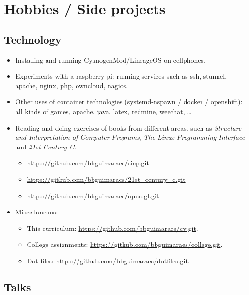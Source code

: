 \section*{Hobbies / Side projects}

\subsection*{Technology}

\begin{itemize}
    \item Installing and running CyanogenMod/LineageOS on cellphones.
    \item
        Experiments with a raspberry pi: running services such as ssh, stunnel,
        apache, nginx, php, owncloud, nagios.
    \item
        Other uses of container technologies (systemd-nspawn / docker /
        openshift): all kinds of games, apache, java, latex, redmine, weechat,
        …
    \item
        Reading and doing exercises of books from different areas, such as
        \textit{Structure and Interpretation of Computer Programs}, \textit{The
        Linux Programming Interface} and \textit{21st Century C}.
        \begin{itemize}
            \item \url{https://github.com/bbguimaraes/sicp.git}
            \item \url{https://github.com/bbguimaraes/21st_century_c.git}
            \item \url{https://github.com/bbguimaraes/open.gl.git}
        \end{itemize}
    \item Miscellaneous:
        \begin{itemize}
            \item
                This curriculum:
                \url{https://github.com/bbguimaraes/cv.git}.
            \item
                College assignments:
                \url{https://github.com/bbguimaraes/college.git}.
            \item
                Dot files:
                \url{https://github.com/bbguimaraes/dotfiles.git}.
        \end{itemize}
\end{itemize}

\subsection*{Talks}


